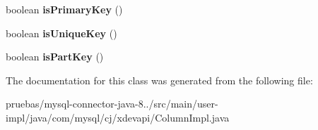 \begin{DoxyCompactItemize}
\item 
\mbox{\label{classcom_1_1mysql_1_1cj_1_1xdevapi_1_1_column_impl_a56cfe1448b9b4939807627e187a1b9c7}} 
boolean {\bfseries is\+Primary\+Key} ()
\item 
\mbox{\label{classcom_1_1mysql_1_1cj_1_1xdevapi_1_1_column_impl_a236fda9cc758db2ffba1a03171c1a84d}} 
boolean {\bfseries is\+Unique\+Key} ()
\item 
\mbox{\label{classcom_1_1mysql_1_1cj_1_1xdevapi_1_1_column_impl_ab6bb9c64f531334a705336fd107fa3b2}} 
boolean {\bfseries is\+Part\+Key} ()
\end{DoxyCompactItemize}


The documentation for this class was generated from the following file\+:\begin{DoxyCompactItemize}
\item 
pruebas/mysql-\/connector-\/java-\/8../src/main/user-\/impl/java/com/mysql/cj/xdevapi/Column\+Impl.\+java\end{DoxyCompactItemize}
